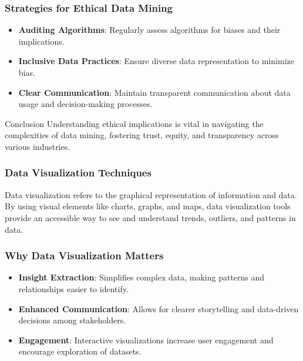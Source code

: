 \documentclass{beamer}
\begin{document}
\begin{frame}[fragile]
    \frametitle{Strategies for Ethical Data Mining}
    
    \begin{itemize}
        \item \textbf{Auditing Algorithms}: Regularly assess algorithms for biases and their implications.
        \item \textbf{Inclusive Data Practices}: Ensure diverse data representation to minimize bias.
        \item \textbf{Clear Communication}: Maintain transparent communication about data usage and decision-making processes.
    \end{itemize}

    \begin{block}{Conclusion}
        Understanding ethical implications is vital in navigating the complexities of data mining, fostering trust, equity, and transparency across various industries.
    \end{block}
\end{frame}

\begin{frame}[fragile]
    \frametitle{Data Visualization Techniques}
    Data visualization refers to the graphical representation of information and data. By using visual elements like charts, graphs, and maps, data visualization tools provide an accessible way to see and understand trends, outliers, and patterns in data.
\end{frame}

\begin{frame}[fragile]
    \frametitle{Why Data Visualization Matters}
    \begin{itemize}
        \item \textbf{Insight Extraction}: Simplifies complex data, making patterns and relationships easier to identify.
        \item \textbf{Enhanced Communication}: Allows for clearer storytelling and data-driven decisions among stakeholders.
        \item \textbf{Engagement}: Interactive visualizations increase user engagement and encourage exploration of datasets.
    \end{itemize}
\end{frame}
\end{document}
